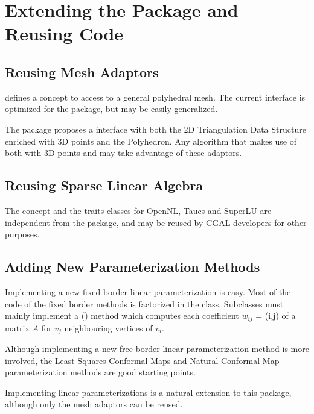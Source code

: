 \section{Extending the Package and Reusing Code}

\subsection{Reusing Mesh Adaptors}

 defines a concept to access to a
general polyhedral mesh.  The current interface is optimized for the
 package, but may be easily generalized.

The package proposes a  interface with
both the 2D Triangulation Data Structure enriched with 3D points and
the Polyhedron. Any algorithm that makes use of both
 with 3D points and
 may take advantage of these adaptors.


\subsection{Reusing Sparse Linear Algebra}

The  concept and the traits classes
for OpenNL, {\sc Taucs} and SuperLU are independent from the
 package, and may be reused by CGAL developers for
other purposes.


\subsection{Adding New Parameterization Methods}

Implementing a new fixed border linear parameterization is easy.  Most
of the code of the fixed border methods is factorized in the
 class.  Subclasses must mainly
implement a () method which computes each
coefficient $w_{ij}$ = (i,j) of a matrix $A$ for $v_j$ neighbouring
vertices of $v_i$.

Although implementing a new free border linear parameterization
method is more involved, the Least Squares Conformal Maps and Natural
Conformal Map parameterization methods are good starting points.

Implementing  linear parameterizations is a natural extension
to this package, although only the mesh adaptors can be reused.


